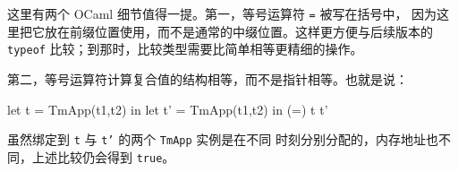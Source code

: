这里有两个 OCaml 细节值得一提。第一，等号运算符 \texttt{=} 被写在括号中，
因为这里把它放在前缀位置使用，而不是通常的中缀位置。这样更方便与后续版本的
\texttt{typeof} 比较；到那时，比较类型需要比简单相等更精细的操作。

第二，等号运算符计算复合值的结构相等，而不是指针相等。也就是说：
\enlargethispage{3\baselineskip}
\begin{taplocamlcode}
let t = TmApp(t1,t2) in
let t' = TmApp(t1,t2) in
(=) t t'
\end{taplocamlcode}
虽然绑定到 \texttt{t} 与 \texttt{t'} 的两个 \texttt{TmApp} 实例是在不同
时刻分别分配的，内存地址也不同，上述比较仍会得到 \texttt{true}。
